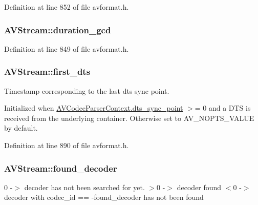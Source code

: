 Definition at line 852 of file avformat.\+h.

\subsubsection[{\texorpdfstring{duration\+\_\+gcd}{duration_gcd}}]{ A\+V\+Stream\+::duration\+\_\+gcd}\hypertarget{struct_a_v_stream_a0074e905c9fdbd79d2ecd623361ec4f8}{}\label{struct_a_v_stream_a0074e905c9fdbd79d2ecd623361ec4f8}


Definition at line 849 of file avformat.\+h.

\subsubsection[{\texorpdfstring{first\+\_\+dts}{first_dts}}]{ A\+V\+Stream\+::first\+\_\+dts}\hypertarget{struct_a_v_stream_a1e341587fa92b173a0d6ae73fadb0409}{}\label{struct_a_v_stream_a1e341587fa92b173a0d6ae73fadb0409}
Timestamp corresponding to the last dts sync point.

Initialized when \hyperlink{struct_a_v_codec_parser_context_af966b95c5e701aacc4feffd678d4e4ba}{A\+V\+Codec\+Parser\+Context.\+dts\+\_\+sync\+\_\+point} $>$= 0 and a D\+TS is received from the underlying container. Otherwise set to A\+V\+\_\+\+N\+O\+P\+T\+S\+\_\+\+V\+A\+L\+UE by default. 

Definition at line 890 of file avformat.\+h.

\subsubsection[{\texorpdfstring{found\+\_\+decoder}{found_decoder}}]{ A\+V\+Stream\+::found\+\_\+decoder}\hypertarget{struct_a_v_stream_aa209c846f64d54a7d73fcfdea0d3df94}{}\label{struct_a_v_stream_aa209c846f64d54a7d73fcfdea0d3df94}
0 -\/$>$ decoder has not been searched for yet. $>$0 -\/$>$ decoder found $<$0 -\/$>$ decoder with codec\+\_\+id == -\/found\+\_\+decoder has not been found 

